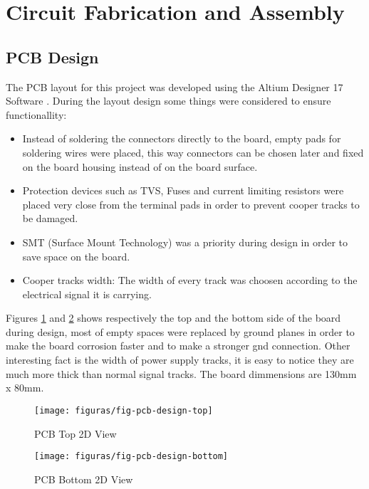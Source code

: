 \section{Circuit Fabrication and Assembly}\label{sec:printed-circuit-board}

	\subsection{PCB Design}\label{ssec:pcb-design}

		The PCB layout for this project was developed using the Altium Designer 17 Software \cite{AD17}. During the layout design some things were considered to ensure functionallity:

		\begin{itemize}
			\item Instead of soldering the connectors directly to the board, empty pads for soldering wires were placed, this way connectors can be chosen later and fixed on the board housing instead of on the board surface.\label{itm:pcb-pin-bars}
			\item Protection devices such as TVS, Fuses and current limiting resistors were placed very close from the terminal pads in order to prevent cooper tracks to be damaged.\label{itm:pcb-protection}
			\item SMT (Surface Mount Technology) was a priority during design in order to save space on the board.\label{itm:pcb-smt}
			\item Cooper tracks width: The width of every track was choosen according to the electrical signal it is carrying.\label{itm:pcb-track}
 		\end{itemize}

 		Figures \ref{fig:pcb-design-top} and \ref{fig:pcb-design-bottom} shows respectively the top and the bottom side of the board during design, most of empty spaces were replaced by ground planes in order to make the board corrosion faster and to make a stronger gnd connection. Other interesting fact is the width of power supply tracks, it is easy to notice they are much more thick than normal signal tracks. The board dimmensions are 130mm x 80mm.

		\begin{figure}[htbp]
			\centering
			\texttt{[image: figuras/fig-pcb-design-top]}
			\caption{PCB Top 2D View}
			\label{fig:pcb-design-top}
		\end{figure}

		\begin{figure}[htbp]
			\centering
			\texttt{[image: figuras/fig-pcb-design-bottom]}
			\caption{PCB Bottom 2D View}
			\label{fig:pcb-design-bottom}
		\end{figure}

